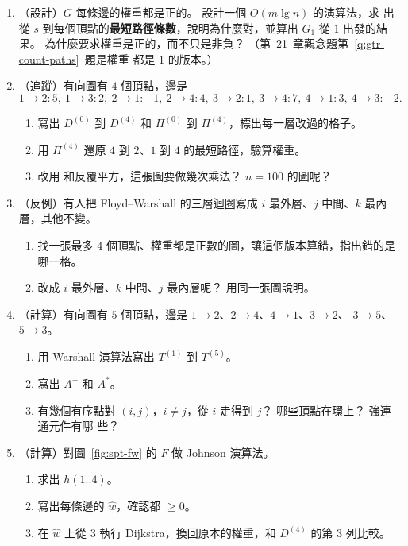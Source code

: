 \begin{enumerate}
\item \label{spt-q-count}（設計）$G$ 每條邊的權重都是正的。 設計一個 $O(m \lg n)$ 的演算法，求
出從 $s$ 到每個頂點的\textbf{最短路徑條數}，說明為什麼對，並算出 $G_1$ 從 $1$ 出發的結果。
為什麼要求權重是正的，而不只是非負？ （第~21~章觀念題第~\ref{q:gtr-count-paths}~題是權重
都是 $1$ 的版本。）

\item \label{spt-q-fw}（追蹤）有向圖有 $4$ 個頂點，邊是
\[
1 \to 2\!:5,\ 1 \to 3\!:2,\ 2 \to 1\!:-1,\ 2 \to 4\!:4,\ 3 \to 2\!:1,\ 3 \to 4\!:7,\ 4 \to 1\!:3,\
4 \to 3\!:-2.
\]
\begin{enumerate}
\item 寫出 $D^{(0)}$ 到 $D^{(4)}$ 和 $\Pi^{(0)}$ 到 $\Pi^{(4)}$，標出每一層改過的格子。
\item 用 $\Pi^{(4)}$ 還原 $4$ 到 $2$、$1$ 到 $4$ 的最短路徑，驗算權重。
\item 改用  和反覆平方，這張圖要做幾次乘法？ $n = 100$ 的圖呢？
\end{enumerate}

\item \label{spt-q-order}（反例）有人把 Floyd--Warshall 的三層迴圈寫成 $i$ 最外層、$j$ 中間、$k$
最內層，其他不變。
\begin{enumerate}
\item 找一張最多 $4$ 個頂點、權重都是正數的圖，讓這個版本算錯，指出錯的是哪一格。
\item 改成 $i$ 最外層、$k$ 中間、$j$ 最內層呢？ 用同一張圖說明。
\end{enumerate}

\item \label{spt-q-tc}（計算）有向圖有 $5$ 個頂點，邊是 $1 \to 2$、$2 \to 4$、$4 \to 1$、$3 \to 2$、
$3 \to 5$、$5 \to 3$。
\begin{enumerate}
\item 用 Warshall 演算法寫出 $T^{(1)}$ 到 $T^{(5)}$。
\item 寫出 $A^{+}$ 和 $A^{*}$。
\item 有幾個有序點對 $(i, j)$，$i \ne j$，從 $i$ 走得到 $j$？ 哪些頂點在環上？ 強連通元件有哪
些？
\end{enumerate}

\item \label{spt-q-johnson}（計算）對圖~\ref{fig:spt-fw} 的 $F$ 做 Johnson 演算法。
\begin{enumerate}
\item 求出 $h(1..4)$。
\item 寫出每條邊的 $\hat{w}$，確認都 $\ge 0$。
\item 在 $\hat{w}$ 上從 $3$ 執行 Dijkstra，換回原本的權重，和 $D^{(4)}$ 的第 $3$ 列比較。
\end{enumerate}


\end{enumerate}
